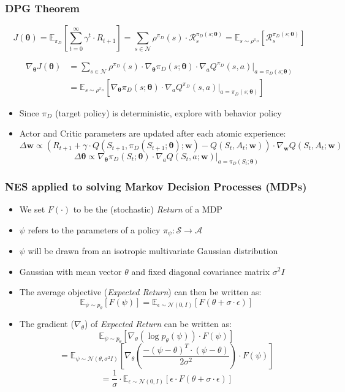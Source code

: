 \documentclass[handout]{beamer}
\begin{document}
\begin{frame}
\frametitle{DPG Theorem}
\pause
$$J(\bm{\theta}) = \mathbb{E}_{\pi_D}[\sum_{t=0}^\infty \gamma^t \cdot R_{t+1}] = \sum_{s \in \mathcal{N}} \rho^{\pi_D}(s) \cdot \mathcal{R}_s^{\pi_D(s;\bm{\theta})} = \mathbb{E}_{s \sim \rho^{\pi_D}}[\mathcal{R}_s^{\pi_D(s;\bm{\theta})}]$$
\pause
\begin{theorem}
\begin{align*}
\nabla_{\bm{\theta}} J(\bm{\theta}) & = \sum_{s \in \mathcal{N}} \rho^{\pi_D}(s) \cdot \nabla_{\bm{\theta}} \pi_D(s; \bm{\theta}) \cdot \nabla_a Q^{\pi_D}(s,a) \Bigr\rvert_{a=\pi_D(s;\bm{\theta})}\\
& = \mathbb{E}_{s \sim \rho^{\pi_D}}[\nabla_{\bm{\theta}} \pi_D(s; \bm{\theta}) \cdot \nabla_a Q^{\pi_D}(s,a) \Bigr\rvert_{a=\pi_D(s;\bm{\theta})}]
\end{align*}
\end{theorem}
\pause
\begin{itemize}[<+->]
\item Since $\pi_D$ (target policy) is deterministic, explore with behavior policy
\item Actor and Critic parameters are updated after each atomic experience:
$$\Delta \bm{w} \propto (R_{t+1} + \gamma \cdot Q(S_{t+1}, \pi_D(S_{t+1}; \bm{\theta}); \bm{w}) - Q(S_t,A_t;\bm{w})) \cdot \nabla_{\bm{w}} Q(S_t,A_t; \bm{w})$$
$$\Delta \bm{\theta} \propto \nabla_{\bm{\theta}} \pi_D(S_t; \bm{\theta}) \cdot \nabla_a Q(S_t,a;\bm{w}) \Bigr\rvert_{a=\pi_D(S_t;\bm{\theta})}$$
\end{itemize}
\end{frame}

\begin{frame}
\frametitle{NES applied to solving Markov Decision Processes (MDPs)}
\begin{itemize}
\item We set $F(\cdot)$ to be the (stochastic) {\em Return} of a MDP
\item $\psi$ refers to the parameters of a policy $\pi_{\psi} : \mathcal{S} \rightarrow \mathcal{A}$
\item $\psi$ will be drawn from an isotropic multivariate Gaussian distribution
\item Gaussian with mean vector $\theta$ and fixed diagonal covariance matrix $\sigma^2 I$
\item The average objective ({\em Expected Return}) can then be written as:
$$\mathbb{E}_{\psi \sim p_{\theta}}[F(\psi)] = \mathbb{E}_{\epsilon \sim \mathcal{N}(0,I)}[F(\theta + \sigma \cdot \epsilon)]$$
\item The gradient ($\nabla_{\theta}$) of {\em Expected Return} can be written as:
$$\mathbb{E}_{\psi \sim p_{\theta}}[\nabla_{\theta}(\log{p_{\theta}(\psi)}) \cdot F(\psi)]$$
$$ = \mathbb{E}_{\psi \sim \mathcal{N}(\theta,\sigma^2 I)}[\nabla_{\theta} ( \frac {-(\psi - \theta)^T \cdot (\psi - \theta)} {2\sigma^2}) \cdot F(\psi)]$$
$$=\frac 1 {\sigma} \cdot \mathbb{E}_{\epsilon \sim \mathcal{N}(0,I)}[\epsilon \cdot F(\theta + \sigma \cdot \epsilon)]$$
\end{itemize}
\end{frame}
\end{document}
